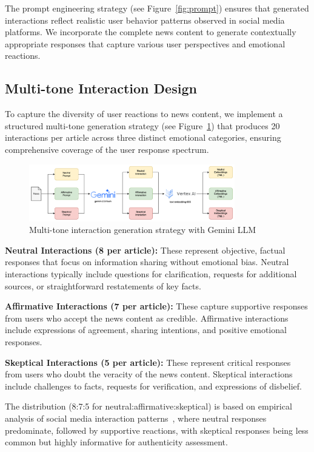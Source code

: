 The prompt engineering strategy (see Figure~\ref{fig:prompt}) ensures that generated interactions reflect realistic user behavior patterns observed in social media platforms. We incorporate the complete news content to generate contextually appropriate responses that capture various user perspectives and emotional reactions.

\subsection{Multi-tone Interaction Design}

To capture the diversity of user reactions to news content, we implement a structured multi-tone generation strategy (see Figure~\ref{fig:interaction-generation}) that produces 20 interactions per article across three distinct emotional categories, ensuring comprehensive coverage of the user response spectrum.

\begin{figure}[h]
    \centering
    \includegraphics[width=0.8\textwidth]{context/methodology/fig/user_interaction_generation.png}
    \caption{Multi-tone interaction generation strategy with Gemini LLM}
    \label{fig:interaction-generation}
\end{figure}

\textbf{Neutral Interactions (8 per article):} These represent objective, factual responses that focus on information sharing without emotional bias. Neutral interactions typically include questions for clarification, requests for additional sources, or straightforward restatements of key facts.

\textbf{Affirmative Interactions (7 per article):} These capture supportive responses from users who accept the news content as credible. Affirmative interactions include expressions of agreement, sharing intentions, and positive emotional responses.

\textbf{Skeptical Interactions (5 per article):} These represent critical responses from users who doubt the veracity of the news content. Skeptical interactions include challenges to facts, requests for verification, and expressions of disbelief.

The distribution (8:7:5 for neutral:affirmative:skeptical) is based on empirical analysis of social media interaction patterns~\cite{user_interaction_distribution_2024}, where neutral responses predominate, followed by supportive reactions, with skeptical responses being less common but highly informative for authenticity assessment.

